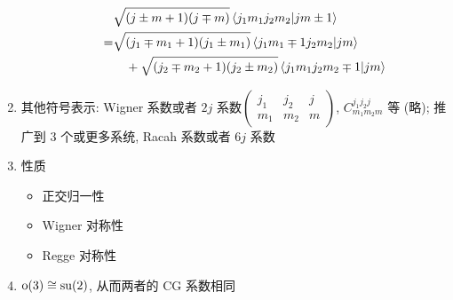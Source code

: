 \documentclass[12pt,a4paper]{article}%
\numberwithin{equation}{section}%
\begin{document}
\begin{enumerate}
\begin{itemize}
		\begin{equation}
			\begin{split}
				&\sqrt{(j\pm m + 1)(j\mp m)}\braket{j_1m_1j_2m_2|jm\pm 1} \\
				= &\sqrt{(j_1\mp m_1 + 1)(j_1\pm m_1)}\braket{j_1m_1\mp 1 j_2m_2|jm} \\
				&\quad + \sqrt{(j_2\mp m_2 + 1)(j_2\pm m_2)}\braket{j_1m_1j_2m_2\mp 1| jm}
			\end{split}
		\end{equation}
	\end{itemize}
	\item 其他符号表示: Wigner 系数或者 $2j$ 系数$\left(\begin{smallmatrix}
			j_1 & j_2 &j \\
			m_1 & m_2 &m
		\end{smallmatrix}\right)$, $C_{m_1m_2m}^{j_1j_2j}$ 等 (略); 推广到 $3$ 个或更多系统, Racah 系数或者 $6j$ 系数
	\item 性质
	\begin{itemize}
		\item 正交归一性
		\item Wigner 对称性
		\item Regge 对称性
	\end{itemize}
	\item $\mathrm{o}(3)\cong\mathrm{su}(2)$, 从而两者的 CG 系数相同
\end{enumerate}
\end{document}
